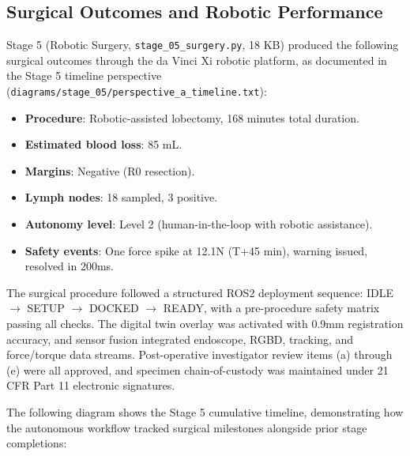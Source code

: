 \subsection{Surgical Outcomes and Robotic Performance}

Stage 5 (Robotic Surgery, \texttt{stage\_05\_surgery.py}, 18 KB) produced the following surgical outcomes through the da Vinci Xi robotic platform, as documented in the Stage 5 timeline perspective (\texttt{diagrams/stage\_05/perspective\_a\_timeline.txt}):

\begin{itemize}[leftmargin=*]
\item \textbf{Procedure}: Robotic-assisted lobectomy, 168 minutes total duration.
\item \textbf{Estimated blood loss}: 85 mL.
\item \textbf{Margins}: Negative (R0 resection).
\item \textbf{Lymph nodes}: 18 sampled, 3 positive.
\item \textbf{Autonomy level}: Level 2 (human-in-the-loop with robotic assistance).
\item \textbf{Safety events}: One force spike at 12.1N (T+45 min), warning issued, resolved in 200ms.
\end{itemize}

The surgical procedure followed a structured ROS2 deployment sequence: IDLE $\rightarrow$ SETUP $\rightarrow$ DOCKED $\rightarrow$ READY, with a pre-procedure safety matrix passing all checks. The digital twin overlay was activated with 0.9mm registration accuracy, and sensor fusion integrated endoscope, RGBD, tracking, and force/torque data streams. Post-operative investigator review items (a) through (e) were all approved, and specimen chain-of-custody was maintained under 21 CFR Part 11 electronic signatures.

The following diagram shows the Stage 5 cumulative timeline, demonstrating how the autonomous workflow tracked surgical milestones alongside prior stage completions:

\newpage

